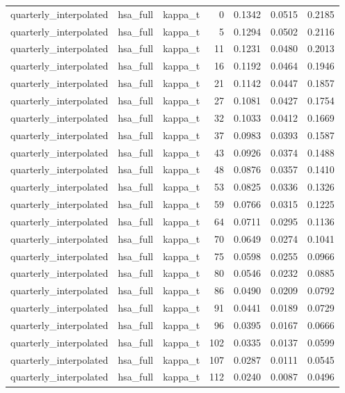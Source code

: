 \begin{tabular}{lllrrrr}
quarterly\_interpolated & hsa\_full & kappa\_t & 0 & 0.1342 & 0.0515 & 0.2185 \\
quarterly\_interpolated & hsa\_full & kappa\_t & 5 & 0.1294 & 0.0502 & 0.2116 \\
quarterly\_interpolated & hsa\_full & kappa\_t & 11 & 0.1231 & 0.0480 & 0.2013 \\
quarterly\_interpolated & hsa\_full & kappa\_t & 16 & 0.1192 & 0.0464 & 0.1946 \\
quarterly\_interpolated & hsa\_full & kappa\_t & 21 & 0.1142 & 0.0447 & 0.1857 \\
quarterly\_interpolated & hsa\_full & kappa\_t & 27 & 0.1081 & 0.0427 & 0.1754 \\
quarterly\_interpolated & hsa\_full & kappa\_t & 32 & 0.1033 & 0.0412 & 0.1669 \\
quarterly\_interpolated & hsa\_full & kappa\_t & 37 & 0.0983 & 0.0393 & 0.1587 \\
quarterly\_interpolated & hsa\_full & kappa\_t & 43 & 0.0926 & 0.0374 & 0.1488 \\
quarterly\_interpolated & hsa\_full & kappa\_t & 48 & 0.0876 & 0.0357 & 0.1410 \\
quarterly\_interpolated & hsa\_full & kappa\_t & 53 & 0.0825 & 0.0336 & 0.1326 \\
quarterly\_interpolated & hsa\_full & kappa\_t & 59 & 0.0766 & 0.0315 & 0.1225 \\
quarterly\_interpolated & hsa\_full & kappa\_t & 64 & 0.0711 & 0.0295 & 0.1136 \\
quarterly\_interpolated & hsa\_full & kappa\_t & 70 & 0.0649 & 0.0274 & 0.1041 \\
quarterly\_interpolated & hsa\_full & kappa\_t & 75 & 0.0598 & 0.0255 & 0.0966 \\
quarterly\_interpolated & hsa\_full & kappa\_t & 80 & 0.0546 & 0.0232 & 0.0885 \\
quarterly\_interpolated & hsa\_full & kappa\_t & 86 & 0.0490 & 0.0209 & 0.0792 \\
quarterly\_interpolated & hsa\_full & kappa\_t & 91 & 0.0441 & 0.0189 & 0.0729 \\
quarterly\_interpolated & hsa\_full & kappa\_t & 96 & 0.0395 & 0.0167 & 0.0666 \\
quarterly\_interpolated & hsa\_full & kappa\_t & 102 & 0.0335 & 0.0137 & 0.0599 \\
quarterly\_interpolated & hsa\_full & kappa\_t & 107 & 0.0287 & 0.0111 & 0.0545 \\
quarterly\_interpolated & hsa\_full & kappa\_t & 112 & 0.0240 & 0.0087 & 0.0496 \\

\end{tabular}
